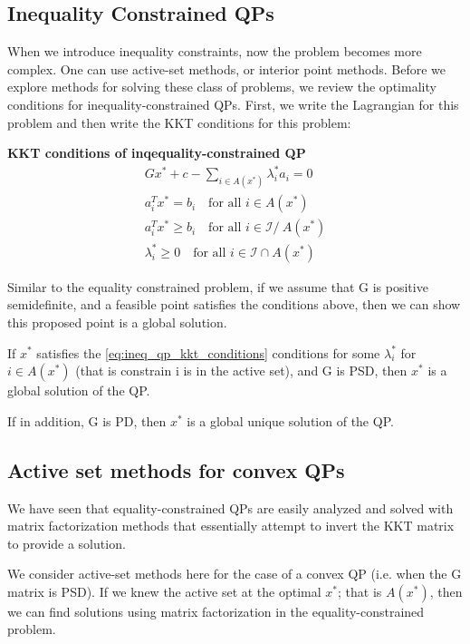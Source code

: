 \documentclass[class=article, crop=false]{standalone}
\begin{document}
	\subsection{Inequality Constrained QPs}
		When we introduce inequality constraints, now the problem becomes more complex. One can use active-set methods, or interior point methods. Before we explore methods for solving these class of problems, we review the optimality conditions for inequality-constrained QPs. First, we write the Lagrangian for this problem and then write the KKT conditions for this problem:

		\textbf{KKT conditions of inqequality-constrained QP}
		\begin{align} 
			\label{eq:ineq_qp_kkt_conditions}
			Gx^* + c - \sum_{i \in A(x^*)} \lambda_i^* a_i = 0 \\
			a_i^T x^* = b_i \quad \text{for all } i \in A(x^*) \\
			a_i^T x^* \ge b_i \quad \text{for all } i \in \mathcal{I}/\ A(x^*) \\
			\lambda_i^* \ge 0 \quad \text{for all } i \in \mathcal{I} \cap A(x^*)
		\end{align}

		Similar to the equality constrained problem, if we assume that G is positive semidefinite, and a feasible point satisfies the conditions above, then we can show this proposed point is a global solution.

		\begin{theorem} 
			If $x^*$ satisfies the \ref{eq:ineq_qp_kkt_conditions} conditions for some $\lambda^*_i$ for $i \in A(x^*)$ (that is constrain i is in the active set), and G is PSD, then $x^*$ is a global solution of the QP.
		\end{theorem}
		\begin{corollary} [Uniqueness]
			If in addition, G is PD, then $x^*$ is a global unique solution of the QP.
		\end{corollary}

	\subsection{Active set methods for convex QPs}
		We have seen that equality-constrained QPs are easily analyzed and solved with matrix factorization methods that essentially attempt to invert the KKT matrix to provide a solution.

		We consider active-set methods here for the case of a convex QP (i.e. when the G matrix is PSD). If we knew the active set at the optimal $x^*$; that is $A(x^*)$, then we can find solutions using matrix factorization in the equality-constrained problem.
\end{document}
